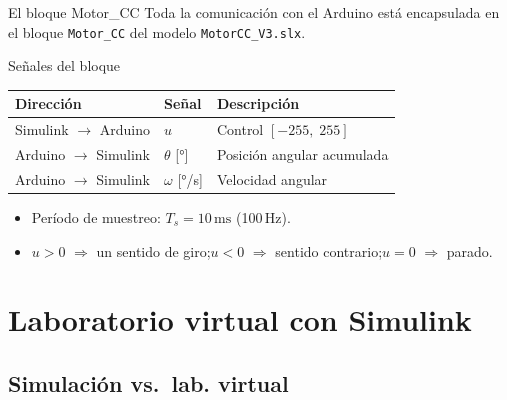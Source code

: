 \documentclass{beamer}
\begin{document}
\begin{frame}{El bloque Motor\_CC}
Toda la comunicación con el Arduino está encapsulada en el bloque
\texttt{Motor\_CC} del modelo \texttt{MotorCC\_V3.slx}.
\vspace{6pt}
\begin{block}{Señales del bloque}
\begin{tabular}{lll}
\toprule
\textbf{Dirección} & \textbf{Señal} & \textbf{Descripción} \\
\midrule
Simulink $\to$ Arduino & $u$ & Control $[-255,\;255]$ \\
Arduino $\to$ Simulink & $\theta$ [°] & Posición angular acumulada \\
Arduino $\to$ Simulink & $\omega$ [°/s] & Velocidad angular \\
\bottomrule
\end{tabular}
\end{block}
\vspace{4pt}
\begin{itemize}
  \item Período de muestreo: $T_s = 10\,\text{ms}$ (100\,Hz).
  \item $u>0$ $\Rightarrow$ un sentido de giro;\quad $u<0$ $\Rightarrow$ sentido contrario;\quad $u=0$ $\Rightarrow$ parado.
\end{itemize}
\end{frame}

\section{Laboratorio virtual con Simulink}

\subsection{Simulación vs.\ lab. virtual}
\end{document}
